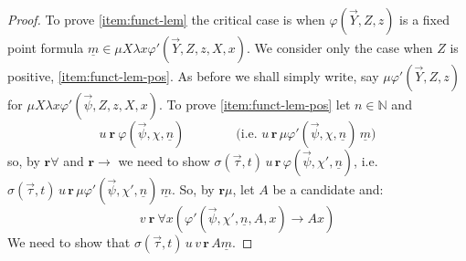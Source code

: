 \documentclass[10pt,a4paper]{amsart}
\theoremstyle{plain}
\theoremstyle{definition}
\renewcommand{\phi}{\varphi}
\theoremstyle{plain}
\theoremstyle{definition} %
\newcommand{\numeral}[1]{\underline{#1}}
\newcommand{\Nat}{\mathbb{N}}
\newcommand{\limp}{\to}
\newcommand{\realises}{\mathbf{r}}
\begin{document}
\begin{proof}
    To prove \eqref{item:funct-lem} the critical case is when $\phi(\vec Y,Z,z) $ is a fixed point formula $ \numeral m \in \mu X \lambda x \phi'(\vec Y,\allowbreak Z,z,X,x)$.
    We consider only the case when $Z$ is positive, \eqref{item:funct-lem-pos}.
    As before we shall simply write, say $\mu\phi'(\vec Y,Z,z)$ for $\mu X\lambda x \phi'(\vec \psi, Z,z,X,x)$.
    To prove \eqref{item:funct-lem-pos} let $n \in \Nat$ and
    \begin{equation}
    \label{eq:funct-lem-mu-antecedent}
        u\ \realises\ \phi(\vec \psi,\chi,\numeral n)
        \qquad\qquad
        \text{(i.e.\ $u\, \realises\, \mu\phi'(\vec \psi,\chi,\numeral n)\, \numeral m$)}
    \end{equation}
    so, by $\realises\forall$ and $\realises\limp$ we need to show $\sigma(\vec \tau,t)\, u\,  \realises\, \phi(\vec \psi,\chi',\numeral n)$, i.e.\ $ \sigma(\vec \tau,t)\, u\,  \realises\,  \mu\phi'(\vec \psi,\chi',\numeral n)\, \numeral m$.
    So, by $\realises\mu$, let $A$ be a candidate and:
    \begin{equation}
    \label{eq:funct-lem-mu-succedent-input}
        v\ \realises\ \forall x (\phi'(\vec \psi,\chi',\numeral n, A,x) \limp Ax)
    \end{equation}
    We need to show that $\sigma(\vec \tau,t)\, u\, v\, \realises\, A\numeral m$.



\end{proof}
\end{document}
